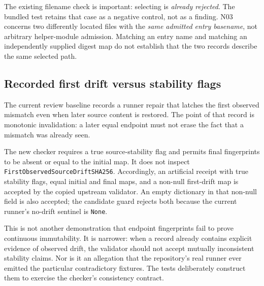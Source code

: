 \documentclass[11pt,letterpaper]{article}
\newcommand{\prop}[1]{\texttt{#1}}
\begin{document}
The existing filename check is important: selecting
 is \emph{already rejected}.
The bundled test retains that case as a negative control, not as a finding.
N03 concerns two differently located files with the \emph{same admitted entry
basename}, not arbitrary helper-module admission. Matching an entry name and
matching an independently supplied digest map do not establish that the two
records describe the same selected path.

\subsection{Recorded first drift versus stability flags}

The current review baseline records a runner repair that latches the first
observed mismatch even when later source content is restored. The point of that
record is monotonic invalidation: a later equal endpoint must not erase the fact
that a mismatch was already seen.\cite{w4}

The new checker requires a true source-stability flag and permits final fingerprints
to be absent or equal to the initial map. It does not inspect
\prop{FirstObservedSourceDriftSHA256}. Accordingly, an artificial receipt with
true stability flags, equal initial and final maps, and a non-null first-drift map
is accepted by the copied upstream validator. An empty dictionary in that
non-null field is also accepted; the candidate guard rejects both because the
current runner's no-drift sentinel is \prop{None}.

This is not another demonstration that endpoint fingerprints fail to prove
continuous immutability. It is narrower: when a record already contains explicit
evidence of observed drift, the validator should not accept mutually inconsistent
stability claims. Nor is it an allegation that the repository's real runner ever
emitted the particular contradictory fixtures. The tests deliberately construct
them to exercise the checker's consistency contract.
\end{document}
